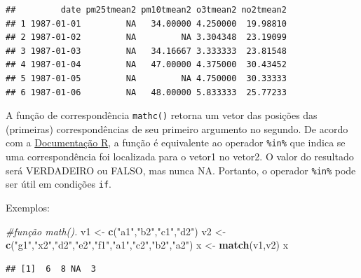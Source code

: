 \documentclass[a4paper]{book}
\newenvironment{Shaded}{\begin{snugshade}}{\end{snugshade}}
\newcommand{\CommentTok}[1]{\textcolor[rgb]{0.56,0.35,0.01}{\textit{#1}}}
\newcommand{\KeywordTok}[1]{\textcolor[rgb]{0.13,0.29,0.53}{\textbf{#1}}}
\newcommand{\NormalTok}[1]{#1}
\newcommand{\OperatorTok}[1]{\textcolor[rgb]{0.81,0.36,0.00}{\textbf{#1}}}
\newcommand{\StringTok}[1]{\textcolor[rgb]{0.31,0.60,0.02}{#1}}
\begin{document}
\begin{verbatim}
##         date pm25tmean2 pm10tmean2 o3tmean2 no2tmean2
## 1 1987-01-01         NA   34.00000 4.250000  19.98810
## 2 1987-01-02         NA         NA 3.304348  23.19099
## 3 1987-01-03         NA   34.16667 3.333333  23.81548
## 4 1987-01-04         NA   47.00000 4.375000  30.43452
## 5 1987-01-05         NA         NA 4.750000  30.33333
## 6 1987-01-06         NA   48.00000 5.833333  25.77233
\end{verbatim}

A função de correspondência \texttt{mathc()} retorna um vetor das posições das (primeiras) correspondências de seu primeiro argumento no segundo. De acordo com a \href{https://stat.ethz.ch/R-manual/R-devel/library/base/html/match.html}{Documentação R}, a função é equivalente ao operador \texttt{\%in\%} que indica se uma correspondência foi localizada para o vetor1 no vetor2. O valor do resultado será VERDADEIRO ou FALSO, mas nunca NA. Portanto, o operador \texttt{\%in\%} pode ser útil em condições \texttt{if}.

Exemplos:

\begin{Shaded}
\begin{Highlighting}[]
\CommentTok{#função math().}
\NormalTok{v1 <-}\StringTok{ }\KeywordTok{c}\NormalTok{(}\StringTok{"a1"}\NormalTok{,}\StringTok{"b2"}\NormalTok{,}\StringTok{"c1"}\NormalTok{,}\StringTok{"d2"}\NormalTok{)}
\NormalTok{v2 <-}\StringTok{ }\KeywordTok{c}\NormalTok{(}\StringTok{"g1"}\NormalTok{,}\StringTok{"x2"}\NormalTok{,}\StringTok{"d2"}\NormalTok{,}\StringTok{"e2"}\NormalTok{,}\StringTok{"f1"}\NormalTok{,}\StringTok{"a1"}\NormalTok{,}\StringTok{"c2"}\NormalTok{,}\StringTok{"b2"}\NormalTok{,}\StringTok{"a2"}\NormalTok{)}
\NormalTok{x <-}\StringTok{ }\KeywordTok{match}\NormalTok{(v1,v2)}
\NormalTok{x}
\end{Highlighting}
\end{Shaded}

\begin{verbatim}
## [1]  6  8 NA  3
\end{verbatim}

\begin{Shaded}
\end{Shaded}
\end{document}
